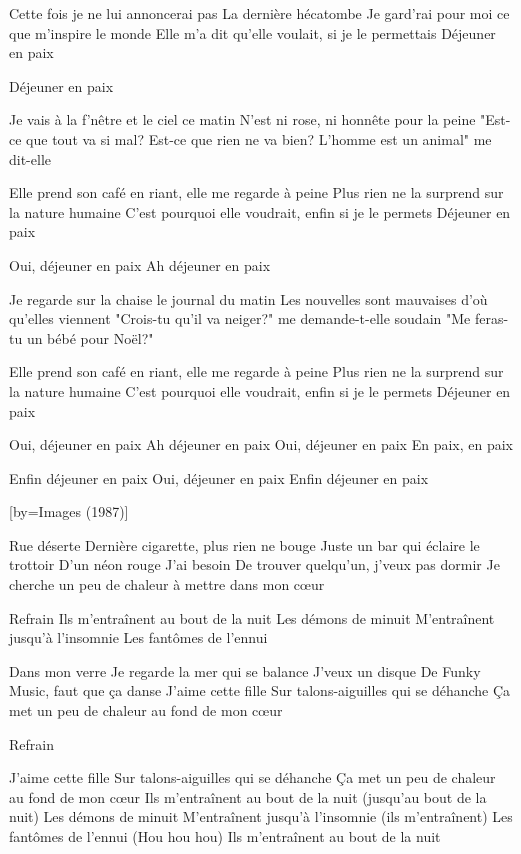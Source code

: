 \beginverse
Cette fois je ne lui annoncerai pas
La dernière hécatombe
Je gard'rai pour moi ce que m'inspire le monde
Elle m'a dit qu'elle voulait, si je le permettais
Déjeuner en paix
\endverse

\beginverse
Déjeuner en paix
\endverse

\beginverse
Je vais à la f'nêtre et le ciel ce matin
N'est ni rose, ni honnête pour la peine
"Est-ce que tout va si mal? Est-ce que rien ne va bien?
L'homme est un animal" me dit-elle
\endverse

\beginverse
Elle prend son café en riant, elle me regarde à peine
Plus rien ne la surprend sur la nature humaine
C'est pourquoi elle voudrait, enfin si je le permets
Déjeuner en paix
\endverse

\beginverse
Oui, déjeuner en paix
Ah déjeuner en paix
\endverse

\beginverse
Je regarde sur la chaise le journal du matin
Les nouvelles sont mauvaises d'où qu'elles viennent
"Crois-tu qu'il va neiger?" me demande-t-elle soudain
"Me feras-tu un bébé pour Noël?"
\endverse

\beginverse
Elle prend son café en riant, elle me regarde à peine
Plus rien ne la surprend sur la nature humaine
C'est pourquoi elle voudrait, enfin si je le permets
Déjeuner en paix
\endverse

\beginverse
Oui, déjeuner en paix
Ah déjeuner en paix
Oui, déjeuner en paix
En paix, en paix
\endverse

\beginverse
Enfin déjeuner en paix
Oui, déjeuner en paix
Enfin déjeuner en paix
\endverse

[by={Images (1987)}]

\beginverse
Rue déserte
Dernière cigarette, plus rien ne bouge
Juste un bar qui éclaire le trottoir
D'un néon rouge
J'ai besoin
De trouver quelqu'un, j'veux pas dormir
Je cherche un peu de chaleur à mettre dans mon cœur
\endverse

\beginverse
Refrain
Ils m'entraînent au bout de la nuit
Les démons de minuit
M'entraînent jusqu'à l'insomnie
Les fantômes de l'ennui
\endverse

\beginverse
Dans mon verre
Je regarde la mer qui se balance
J'veux un disque
De Funky Music, faut que ça danse
J'aime cette fille
Sur talons-aiguilles qui se déhanche
Ça met un peu de chaleur au fond de mon cœur
\endverse

\beginverse
Refrain \\[bis]
\endverse

\beginverse
J'aime cette fille
Sur talons-aiguilles qui se déhanche
Ça met un peu de chaleur au fond de mon cœur
Ils m'entraînent au bout de la nuit (jusqu'au bout de la nuit)
Les démons de minuit
M'entraînent jusqu'à l'insomnie (ils m'entraînent)
Les fantômes de l'ennui (Hou hou hou)
Ils m'entraînent au bout de la nuit
\endverse

